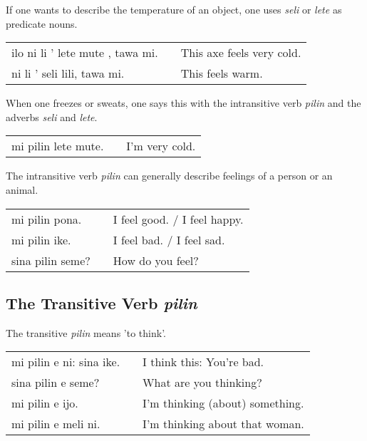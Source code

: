 {If one wants to describe the temperature of an object, one uses \textit{seli} or \textit{lete} as predicate nouns. 

\begin{supertabular}{p{5,5cm}|ll}
ilo ni li ' lete mute , tawa mi.  && This axe feels very cold. \\
ni li ' seli lili, tawa mi. && This feels warm. \\
\end{supertabular} 

When one freezes or sweats, one says this with the intransitive verb \textit{pilin} and the adverbs \textit{seli} and \textit{lete}.

\begin{supertabular}{p{5,5cm}|ll}
mi pilin lete mute. && I'm very cold. \\
\end{supertabular}

The intransitive verb \textit{pilin} can generally describe feelings of a person or an animal. 

\begin{supertabular}{p{5,5cm}|ll}
mi pilin pona. && I feel good. / I feel happy. \\
mi pilin ike. && I feel bad. / I feel sad. \\
sina pilin seme? && How do you feel? \\ 
\end{supertabular} 

%
\subsection*{The Transitive Verb \textit{pilin}}
%

The transitive \textit{pilin} means 'to think'.

\begin{supertabular}{p{5,5cm}|ll}
mi pilin e ni: sina ike. && I think this: You're bad. \\ 
sina pilin e seme? && What are you thinking? \\
mi pilin e ijo. && I'm thinking (about) something. \\
mi pilin e meli ni. && I'm thinking about that woman. \\
\end{supertabular} 
%
%
% 
\newpage
%
}
